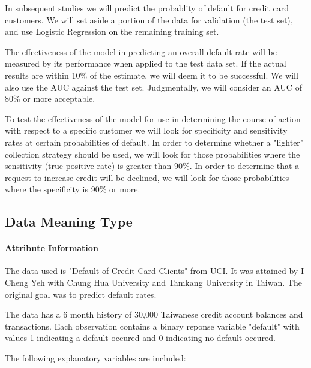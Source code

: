 \documentclass[11pt]{article}
\begin{document}
In subsequent studies we will predict the probablity of default for
credit card customers. We will set aside a portion of the data for
validation (the test set), and use Logistic Regression on the remaining
training set.

The effectiveness of the model in predicting an overall default rate
will be measured by its performance when applied to the test data set.
If the actual results are within 10\% of the estimate, we will deem it
to be successful. We will also use the AUC against the test set.
Judgmentally, we will consider an AUC of 80\% or more acceptable.

To test the effectiveness of the model for use in determining the course
of action with respect to a specific customer we will look for
specificity and sensitivity rates at certain probabilities of default.
In order to determine whether a "lighter" collection strategy should be
used, we will look for those probabilities where the sensitivity (true
positive rate) is greater than 90\%. In order to determine that a
request to increase credit will be declined, we will look for those
probabilities where the specificity is 90\% or more.

    \subsection{Data Meaning Type}\label{data-meaning-type}

\paragraph{Attribute Information}\label{attribute-information}

The data used is "Default of Credit Card Clients" from UCI. It was
attained by I-Cheng Yeh with Chung Hua University and Tamkang University
in Taiwan. The original goal was to predict default rates.

The data has a 6 month history of 30,000 Taiwanese credit account
balances and transactions. Each observation contains a binary reponse
variable "default" with values 1 indicating a default occured and 0
indicating no default occured.

The following explanatory variables are included:
\end{document}
